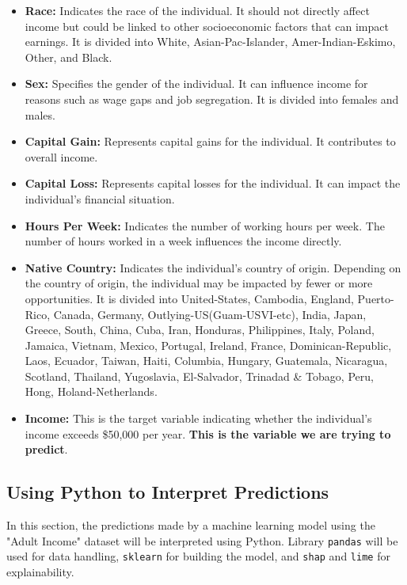 \documentclass[10pt,journal,compsoc]{IEEEtran}
\begin{document}
\begin{itemize}
    \item \textbf{Race:} Indicates the race of the individual. It should not directly affect income but could be linked to other socioeconomic factors that can impact earnings. It is divided into White, Asian-Pac-Islander, Amer-Indian-Eskimo, Other, and Black.

    \item \textbf{Sex:} Specifies the gender of the individual. It can influence income for reasons such as wage gaps and job segregation. It is divided into females and males.

    \item \textbf{Capital Gain:} Represents capital gains for the individual. It contributes to overall income.

    \item \textbf{Capital Loss:} Represents capital losses for the individual. It can impact the individual's financial situation.

    \item \textbf{Hours Per Week:} Indicates the number of working hours per week. The number of hours worked in a week influences the income directly.

    \item \textbf{Native Country:} Indicates the individual's country of origin. Depending on the country of origin, the individual may be impacted by fewer or more opportunities. It is divided into United-States, Cambodia, England, Puerto-Rico, Canada, Germany, Outlying-US(Guam-USVI-etc), India, Japan, Greece, South, China, Cuba, Iran, Honduras, Philippines, Italy, Poland, Jamaica, Vietnam, Mexico, Portugal, Ireland, France, Dominican-Republic, Laos, Ecuador, Taiwan, Haiti, Columbia, Hungary, Guatemala, Nicaragua, Scotland, Thailand, Yugoslavia, El-Salvador, Trinadad \& Tobago, Peru, Hong, Holand-Netherlands.

    \item \textbf{Income:} This is the target variable indicating whether the individual's income exceeds  \$50,000 per year. \textbf{This is the variable we are trying to predict}.

\end{itemize}

\subsection{Using Python to Interpret Predictions}
In this section, the predictions made by a machine learning model using the "Adult Income" dataset will be interpreted using Python. Library \texttt{pandas} will be used for data handling, \texttt{sklearn} for building the model, and \texttt{shap} and \texttt{lime} for explainability.
\end{document}

